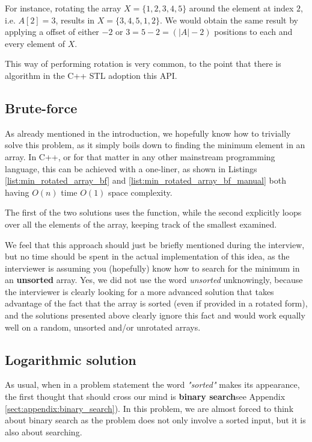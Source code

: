 For instance, rotating the array $X=\{1,2,3,4,5\}$ around the element at index $2$, i.e. $A[2]=3$, results in $X=\{3,4,5,1,2\}$. We would obtain the same result by applying a offset of either $-2$ or $3=5-2=(|A|-2)$ positions to each and every element of $X$. 

This way of performing rotation is very common, to the point that there is algorithm in the C++ STL\cite{cit::std::rotate} adoption this API.


\subsection{Brute-force}
\label{min_rotated_array:sec:bruteforce}
As already mentioned in the introduction, we hopefully know how to trivially solve this problem, as it simply boils down to finding the minimum element in an array.
In C++, or for that matter in any other mainstream programming language, this can be achieved with a one-liner, as shown in Listings \ref{list:min_rotated_array_bf} and \ref{list:min_rotated_array_bf_manual} both having $O(n)$ time $O(1)$ space complexity.






The first of the two solutions uses the  function, while the second explicitly loops over all the elements of the array, keeping track of the smallest examined. 

We feel that this approach should just be briefly mentioned during the interview, but no time should be spent in the actual implementation of this idea, as the interviewer is assuming you (hopefully) know how to search for the minimum in an \textbf{unsorted} array. Yes, we did not use the word \textit{unsorted} unknowingly, because the interviewer is clearly looking for a more advanced solution that takes advantage of the fact that the array is sorted (even if provided in a rotated form), and the solutions presented above clearly ignore this fact and would work equally well on a random, unsorted and/or unrotated arrays.

\subsection{Logarithmic solution}
\label{min_rotated_array:sec:log}
As usual, when in a problem statement the word \textit{"sorted"} makes its appearance, the first thought that should cross our mind is \textbf{binary search}see Appendix \ref{sect:appendix:binary_search}). In this problem, we are almost forced to think about binary search as the problem does not only involve a sorted input, but it is also about searching. 

